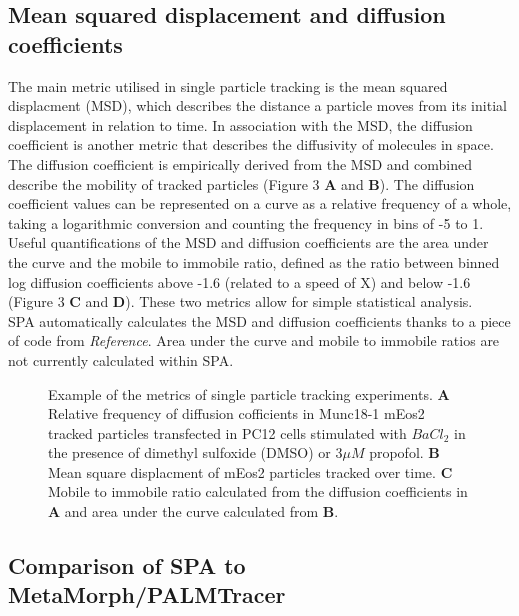 \documentclass[11pt]{article} %
\begin{document}
\subsection{Mean squared displacement and diffusion coefficients}

The main metric utilised in single particle tracking is the mean squared displacment (MSD), which describes the distance a particle moves from its initial displacement in relation to time. In association with the MSD, the diffusion coefficient is another metric that describes the diffusivity of molecules in space. The diffusion coefficient is empirically derived from the MSD and combined describe the mobility of tracked particles (Figure 3 \textbf{A} and \textbf{B}). The diffusion coefficient values can be represented on a curve as a relative frequency of a whole, taking a logarithmic conversion and counting the frequency in bins of -5 to 1.\\


Useful quantifications of the MSD and diffusion coefficients are the area under the curve and the mobile to immobile ratio, defined as the ratio between binned log diffusion coefficients above -1.6 (related to a speed of X) and below -1.6 (Figure 3 \textbf{C} and \textbf{D}). These two metrics allow for simple statistical analysis.\\

SPA automatically calculates the MSD and diffusion coefficients thanks to a piece of code from \textit{Reference}. Area under the curve and mobile to immobile ratios are not currently calculated within SPA. 

	\begin{figure}[H]
	\caption{Example of the metrics of single particle tracking experiments. \textbf{A} Relative frequency of diffusion cofficients in Munc18-1 mEos2 tracked 			particles transfected in PC12 cells stimulated with $BaCl_2$ in the presence of dimethyl sulfoxide (DMSO) or $3\mu M$ propofol. \textbf{B} Mean square displacment of mEos2 particles tracked over time. \textbf{C} Mobile to immobile ratio calculated from the diffusion coefficients in \textbf{A} and area under the curve calculated from \textbf{B}.}
	\end{figure}

\subsection{Comparison of SPA to MetaMorph/PALMTracer}
\end{document}
